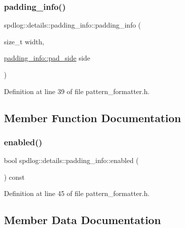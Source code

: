 \subsubsection{\texorpdfstring{padding\+\_\+info()}{padding\_info()}\hspace{0.1cm}{\footnotesize\ttfamily [2/2]}}
{\footnotesize\ttfamily spdlog\+::details\+::padding\+\_\+info\+::padding\+\_\+info (\begin{DoxyParamCaption}\item[{size\+\_\+t}]{width,  }\item[{\hyperlink{structspdlog_1_1details_1_1padding__info_aa2ad84ba80fb8fc36b753d1a34e4942e}{padding\+\_\+info\+::pad\+\_\+side}}]{side }\end{DoxyParamCaption})\hspace{0.3cm}{\ttfamily [inline]}}



Definition at line 39 of file pattern\+\_\+formatter.\+h.



\subsection{Member Function Documentation}
\mbox{\label{structspdlog_1_1details_1_1padding__info_a2c315d1c5ccdac54957d3d9281830ea9}} 
\subsubsection{\texorpdfstring{enabled()}{enabled()}}
{\footnotesize\ttfamily bool spdlog\+::details\+::padding\+\_\+info\+::enabled (\begin{DoxyParamCaption}{ }\end{DoxyParamCaption}) const\hspace{0.3cm}{\ttfamily [inline]}}



Definition at line 45 of file pattern\+\_\+formatter.\+h.



\subsection{Member Data Documentation}
\mbox{\label{structspdlog_1_1details_1_1padding__info_af03346e385de821038e0aec989741d14}} 
